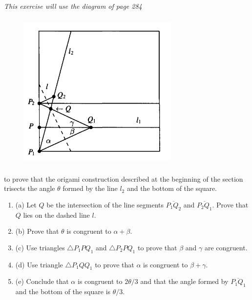 \documentclass[11pt,a4paper]{article}
\newcommand{\be} {\begin{enumerate}}
\newcommand{\ee} {\end{enumerate}}
\begin{document}
{\it This exercise will use the diagram of page 284 
\begin{figure}[htbp]
\begin{center}
\includegraphics [width=8cm,height=8cm] {Ex_10_3_1.png}
\end{center}
\end{figure}
to prove that the origami construction described at the beginning of the section trisects the angle $\theta$ formed by the line $l_2$ and the bottom of the square.
\be
\item[(a)] Let $Q$ be the intersection of the line segments $\overline{P_1Q_2}$ and $\overline{P_2Q_1}$. Prove that $Q$ lies on the dashed line $l$.
\item[(b)] Prove that $\theta$ is congruent to $\alpha+\beta$.
\item[(c)] Use triangles $\bigtriangleup P_1PQ_1$ and $\bigtriangleup P_2PQ_1$ to prove that $\beta$ and $\gamma$ are congruent.
\item[(d)] Use triangle $\bigtriangleup P_1QQ_1$ to prove that $\alpha$ is congruent to $\beta + \gamma$.
\item[(e)] Conclude that $\alpha$ is congruent to $2\theta/3$ and that the angle formed by $\overline{P_1Q_1}$ and the bottom of the square is $\theta/3$. 
\ee
}
\end{document}
